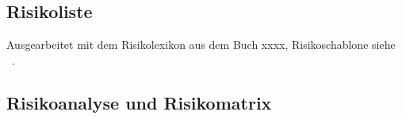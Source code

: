 \subsection{Risikoliste}
Ausgearbeitet mit dem Risikolexikon aus dem Buch xxxx, Risikoschablone
siehe ~\cite{AhrendtsFabian2008Il:w}.


\subsection{Risikoanalyse und Risikomatrix}





